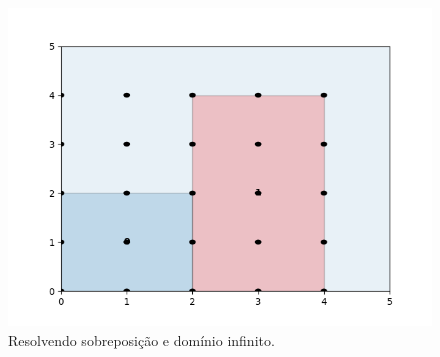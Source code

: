 \begin{figure}[H]
    \centering
    \includegraphics[scale=0.5]{utils/images/discrete_example}
    \caption{Resolvendo sobreposição e domínio infinito.}
    \label{fig:sobreposicao-dominio4}
\end{figure}
